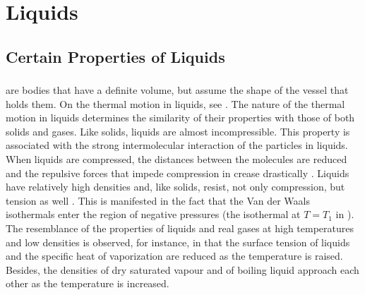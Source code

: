 
\chapter{Liquids}
\label{ch-13}

\section{Certain Properties of Liquids}
\label{sec-13.1}

\subsection{}\label{13.1.1}  are bodies that have a definite volume, but assume the shape of the vessel that holds them. On the thermal motion in liquids, see . The nature of the thermal motion in liquids determines the similarity of their properties with those of both solids and gases. Like solids, liquids are almost incompressible. This property is associated with the strong intermolecular interaction of the particles in liquids. When liquids are compressed, the distances between the molecules are reduced and the repulsive forces that impede compression in­ crease drastically . Liquids have relatively high densities and, like solids, resist, not only compression, but tension as well . This is manifested in the fact that the Van der Waals isothermals enter the region of negative pressures (the isothermal at $T = T_{1}$ in ). The resemblance of the properties of liquids and real gases at high temperatures and low densities is observed, for instance, in that the surface tension of liquids  and the specific heat of vaporization  are reduced as the temperature is raised. Besides, the densities of dry saturated vapour  and of boiling liquid  approach each other as the temperature is increased. 

